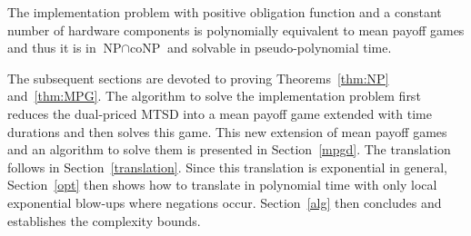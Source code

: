 \begin{theorem}\label{thm:MPG}
The implementation problem with  
positive obligation function and 
a constant number of hardware components
is polynomially equivalent to mean payoff games and 
thus it is in $\text{NP} \cap \text{coNP}$ and 
solvable in pseudo-polynomial time.
\end{theorem}


The subsequent sections are devoted to proving Theorems~\ref{thm:NP} and~\ref{thm:MPG}. The algorithm to solve the implementation problem first reduces the dual-priced MTSD into a mean payoff game extended with time durations and then solves this game. This new extension of mean payoff games and an algorithm to solve them is presented in Section~\ref{mpgd}. The translation follows in Section~\ref{translation}. Since this translation is exponential in general, Section~\ref{opt} then shows how to translate in polynomial time with only local exponential blow-ups where negations occur. Section~\ref{alg} then concludes and establishes the complexity bounds.

